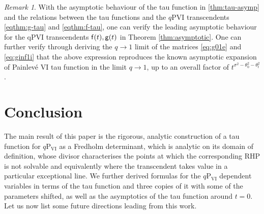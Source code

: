 \documentclass[a4paper,reqno,11pt]{amsart}
\newcommand{\myrmk}[2]{\begin{quote}\fbox{\begin{minipage}{\linewidth}\small \noindent{\color{red}\bf #2:} #1{\color{red}}\end{minipage}}\end{quote}}
\newcommand{\rmkH}[1]{\myrmk{#1}{HD}}
\numberwithin{equation}{section}
\numberwithin{figure}{section}
\theoremstyle{plain}
\theoremstyle{remark}
\newtheorem{remark}[theorem]{Remark}
\newcommand\Psix{\textrm{P}_{\textrm{VI}}}
\numberwithin{rhp}{section}
\begin{document}
\begin{remark}
With the asymptotic behaviour of the tau function in  \eqref{thm:tau-asymp} and the relations between the tau functions and the $q$PVI transcendents \eqref{eqthm:g-tau} and \eqref{eqthm:f-tau}, one can verify the leading asymptotic behaviour for the qPVI transcendents ${\sf f}(t), {\sf g}(t)$ in Theorem \ref{thm:asymptotic}. One can further verify through deriving the $q\to 1$ limit of the matrices  \eqref{eq:g01e} and \eqref{eq:ginf1i} that the above expression reproduces the known asymptotic expansion of Painlev\'e VI tau function \cite[(2.47)]{gavrylenko2018fredholm} in the limit $q\to 1$, up to an overall factor of $ t^{\sigma^2 - \theta_0^2 - \theta_t^2 }$.     

\end{remark}







\section{Conclusion}\label{sec:conclusion}
The main result of this paper is the rigorous, analytic
construction of a tau function for $q\Psix$ as a Fredholm determinant, which is analytic on its domain of definition, whose divisor characterises the points at which the corresponding RHP is not solvable and equivalently where the transcendent takes value in a particular exceptional line. We further derived formulas for the $q\Psix$ dependent variables in terms of the tau function and three copies of it with some of the parameters shifted, as well as the asymptotics of the tau function around $t=0$. Let us now list some future directions leading from this work.
\end{document}
